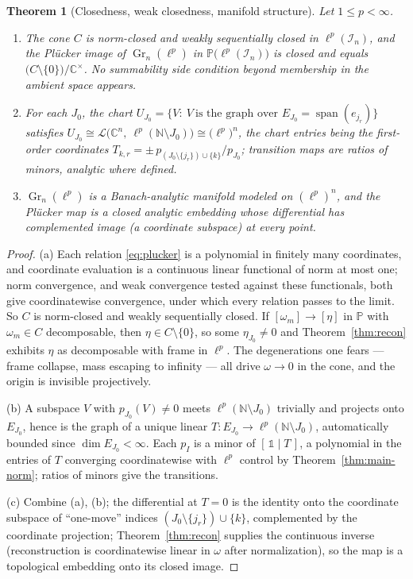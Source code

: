 \documentclass[11pt]{amsart}
\newtheorem{theorem}{Theorem}[section]
\theoremstyle{definition}
\newcommand{\N}{\mathbb{N}}
\newcommand{\C}{\mathbb{C}}
\newcommand{\Gr}{\operatorname{Gr}}
\begin{document}
\begin{theorem}[Closedness, weak closedness, manifold structure]\label{thm:manifold}
Let $1\le p<\infty$.
\begin{enumerate}[label=\textup{(\alph*)}]
\item The cone $C$ is norm-closed and weakly sequentially closed in $\ell^p(\mathcal I_n)$, and the Pl\"ucker image of $\Gr_n(\ell^p)$ in $\mathbb P\big(\ell^p(\mathcal I_n)\big)$ is closed and equals $\big(C\setminus\{0\}\big)/\C^\times$. No summability side condition beyond membership in the ambient space appears.
\item For each $J_0$, the chart $U_{J_0}=\{V:\ V\ \text{is the graph over }E_{J_0}=\operatorname{span}(e_{j_r})\}$ satisfies
$U_{J_0}\cong\mathcal L\big(\C^n,\ \ell^p(\N\setminus J_0)\big)\cong \big(\ell^p\big)^n$,
the chart entries being the first-order coordinates $T_{k,r}=\pm\,p_{(J_0\setminus\{j_r\})\cup\{k\}}/p_{J_0}$; transition maps are ratios of minors, analytic where defined.
\item $\Gr_n(\ell^p)$ is a Banach-analytic manifold modeled on $(\ell^p)^n$, and the Pl\"ucker map is a closed analytic embedding whose differential has complemented image \textup{(}a coordinate subspace\textup{)} at every point.
\end{enumerate}
\end{theorem}

\begin{proof}
(a) Each relation \eqref{eq:plucker} is a polynomial in finitely many coordinates, and coordinate evaluation is a continuous linear functional of norm at most one; norm convergence, and weak convergence tested against these functionals, both give coordinatewise convergence, under which every relation passes to the limit. So $C$ is norm-closed and weakly sequentially closed. If $[\omega_m]\to[\eta]$ in $\mathbb P$ with $\omega_m\in C$ decomposable, then $\eta\in C\setminus\{0\}$, so some $\eta_{J_0}\ne0$ and Theorem~\ref{thm:recon} exhibits $\eta$ as decomposable with frame in $\ell^p$. The degenerations one fears --- frame collapse, mass escaping to infinity --- all drive $\omega\to0$ in the cone, and the origin is invisible projectively.

(b) A subspace $V$ with $p_{J_0}(V)\ne0$ meets $\ell^p(\N\setminus J_0)$ trivially and projects onto $E_{J_0}$, hence is the graph of a unique linear $T:E_{J_0}\to\ell^p(\N\setminus J_0)$, automatically bounded since $\dim E_{J_0}<\infty$. Each $p_I$ is a minor of $[\,\mathbb 1\mid T\,]$, a polynomial in the entries of $T$ converging coordinatewise with $\ell^p$ control by Theorem~\ref{thm:main-norm}; ratios of minors give the transitions.

(c) Combine (a), (b); the differential at $T=0$ is the identity onto the coordinate subspace of ``one-move'' indices $(J_0\setminus\{j_r\})\cup\{k\}$, complemented by the coordinate projection; Theorem~\ref{thm:recon} supplies the continuous inverse (reconstruction is coordinatewise linear in $\omega$ after normalization), so the map is a topological embedding onto its closed image.
\end{proof}
\end{document}
